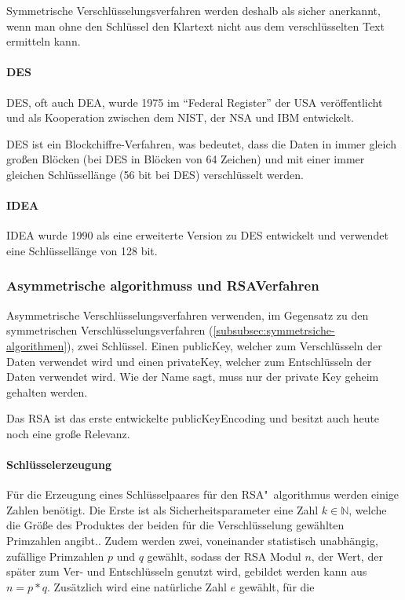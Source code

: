 Symmetrische Verschlüsselungsverfahren werden deshalb als sicher anerkannt, wenn man ohne den Schlüssel den Klartext nicht aus dem verschlüsselten Text ermitteln kann.\autocite[\pagef~5]{Kryptografische_algorithmen}

\paragraph{\acf{DES}}\label{par:data-encryption-standard}
\ac{DES}, oft auch \ac{DEA}, wurde 1975 im ``Federal Register'' der USA
veröffentlicht und als Kooperation zwischen dem \ac{NIST}, der \ac{NSA} und IBM entwickelt.\autocite[\pagef~232]{nsa-meyer}

\ac{DES} ist ein Blockchiffre-Verfahren, was bedeutet, dass die Daten in immer gleich großen Blöcken (bei \ac{DES} in Blöcken von 64 Zeichen) und mit einer immer gleichen Schlüssellänge (56 bit bei \ac{DES}) verschlüsselt werden.\autocite[\pagef~6]{Kryptografische_algorithmen}

\paragraph{\acf{IDEA}}\label{par:internet-datatencryption-algorithm}
\ac{IDEA} wurde 1990 als eine erweiterte Version zu \ac{DES} entwickelt und verwendet eine Schlüssellänge von 128 bit.\autocite[\pagef~6]{Kryptografische_algorithmen}

\subsubsection[Asymmetrische Algorithmen und RSA-Verfahren]{Asymmetrische \glspl{algorithmus} und \acs{RSA}\nobreakdash Verfahren}\label{subsubsec:asymmetrische-algorithmen}
Asymmetrische Verschlüsselungsverfahren verwenden, im Gegensatz zu den symmetrischen Verschlüsselungsverfahren (\autoref{subsubsec:symmetrsiche-algorithmen}), zwei Schlüssel.
Einen \gls{publicKey}, welcher zum Verschlüsseln der Daten verwendet wird und einen \gls{privateKey}, welcher zum Entschlüsseln der Daten verwendet wird.
Wie der Name sagt, muss nur der private Key geheim gehalten werden.

Das \ac{RSA} ist das erste entwickelte \gls{publicKeyEncoding} und besitzt auch heute noch eine große Relevanz.\autocite[\pagef~168]{buchmann_einfuhrung_2016}

\paragraph[Schlüsselerzeugung]{Schlüsselerzeugung}\label{par:schluesselerzeugung}
Für die Erzeugung eines Schlüsselpaares für den \ac{RSA}"~\gls{algorithmus} werden einige Zahlen benötigt.
Die Erste ist als Sicherheitsparameter eine Zahl \(k \in \mathbb{N}\), welche die Größe des Produktes der beiden für die Verschlüsselung gewählten Primzahlen angibt..
Zudem werden zwei, voneinander statistisch unabhängig, zufällige Primzahlen $p$ und $q$ gewählt, sodass der \ac{RSA} Modul $n$, der Wert, der später zum Ver- und Entschlüsseln genutzt wird, gebildet werden kann aus \(n = p*q\).
Zusätzlich wird eine natürliche Zahl $e$ gewählt, für die


